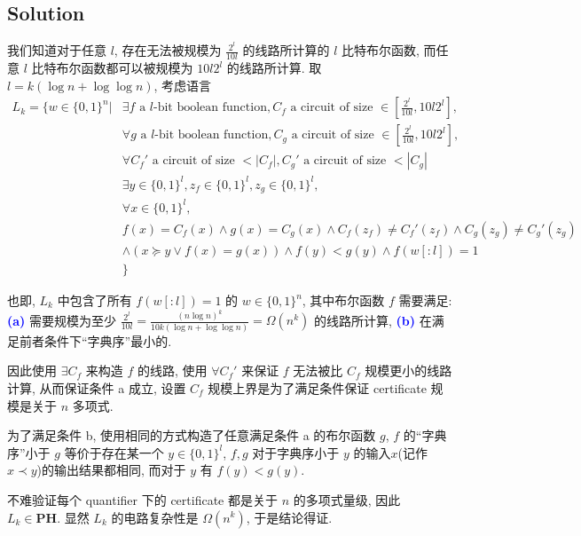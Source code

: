 \documentclass[8pt]{article}
\theoremstyle{compact}
\def\num#1{\textnormal{\textbf{\mbox{\textcolor{blue}{(#1)}}}}}
\begin{document}
\subsection*{Solution}
我们知道对于任意 $l$, 存在无法被规模为 $\frac{2^l}{10l}$ 的线路所计算的 $l$ 比特布尔函数, 而任意 $l$ 比特布尔函数都可以被规模为 $10l2^l$ 的线路所计算. 取 $l = k(\log n + \log\log n)$, 考虑语言
\begin{equation*}
	\begin{split}
		L_k = \{w \in \{0, 1\}^n | &\exists f \text{ a } l \text{-bit boolean function}, C_f \text{ a circuit of size } \in \left[\frac{2^l}{10l}, 10l2^l\right], \\
		&\forall g \text{ a } l \text{-bit boolean function}, C_g \text{ a circuit of size } \in \left[\frac{2^l}{10l}, 10l2^l\right], \\ &\forall C_f' \text{ a circuit of size } < |C_f|, C_g' \text{ a circuit of size } < |C_g|\\
		&\exists y \in \{0, 1\}^l, z_f \in \{0, 1\}^l, z_g \in \{0, 1\}^l,\\
		&\forall x \in \{0, 1\}^l, \\
		&f(x) = C_f(x) \wedge g(x) = C_g(x) \wedge C_f(z_f) \neq C_f'(z_f) \wedge C_g(z_g) \neq C_g'(z_g) \\ &\wedge(x \succcurlyeq y \vee f(x) = g(x)) \wedge f(y) < g(y) \wedge f(w[:l]) = 1\\
		&\}
	\end{split}
\end{equation*}

也即, $L_k$ 中包含了所有 $f(w[:l]) = 1$ 的 $w \in \{0, 1\}^n$, 其中布尔函数 $f$ 需要满足: \num{a} 需要规模为至少 $\frac{2^l}{10l} = \frac{(n\log n)^k}{10k(\log n + \log\log n)} = \Omega(n^k)$ 的线路所计算, \num{b} 在满足前者条件下“字典序”最小的.

因此使用 $\exists C_f$ 来构造 $f$ 的线路, 使用 $\forall C_f'$ 来保证 $f$ 无法被比 $C_f$ 规模更小的线路计算, 从而保证条件 a 成立, 设置 $C_f$ 规模上界是为了满足条件保证 certificate 规模是关于 $n$ 多项式. 

为了满足条件 b, 使用相同的方式构造了任意满足条件 a 的布尔函数 $g$, $f$ 的“字典序”小于 $g$ 等价于存在某一个 $y \in \{0, 1\}^l$, $f, g$ 对于字典序小于 $y$ 的输入$x$(记作 $x \prec y$)的输出结果都相同, 而对于 $y$ 有 $f(y) < g(y)$.

不难验证每个 quantifier 下的 certificate 都是关于 $n$ 的多项式量级, 因此 $L_k \in \textbf{PH}$. 显然 $L_k$ 的电路复杂性是 $\Omega(n^k)$, 于是结论得证.
\end{document}
